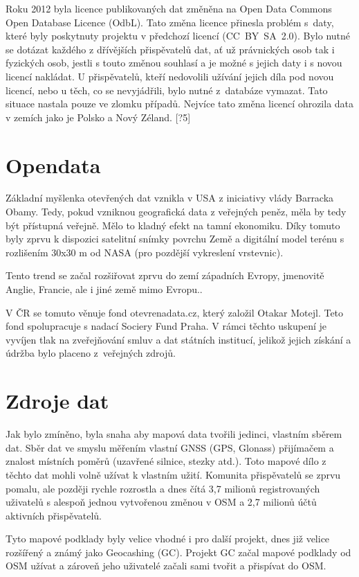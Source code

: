 Roku 2012 byla licence publikovaných dat změněna na Open Data Commons 
Open Database Licence (OdbL). Tato změna licence přinesla problém 
s~daty, které byly poskytnuty projektu v předchozí licencí 
(CC­~BY~SA~2.0). Bylo nutné se dotázat každého z dřívějších 
přispěvatelů dat, ať už právnických osob tak i fyzických osob, jestli 
s touto změnou souhlasí a je možné s jejich daty i s novou licencí 
nakládat. U přispěvatelů, kteří nedovolili užívání jejich díla 
pod novou licencí, nebo u těch, co se nevyjádřili, bylo nutné 
z~databáze vymazat. Tato situace nastala pouze ve zlomku případů. 
Nejvíce tato změna licencí ohrozila data v zemích jako je Polsko a Nový Zéland.
 [?5] 

\section{Opendata}
\label{opendata}
Základní myšlenka otevřených dat vznikla v USA z iniciativy vlády Barracka Obamy. 
Tedy, pokud vzniknou geografická data z veřejných peněz, měla by tedy být přístupná 
veřejně. Mělo to kladný efekt na tamní ekonomiku.
Díky tomuto byly zprvu k dispozici satelitní snímky povrchu 
Země a digitální model terénu s rozlišením 30x30 m od NASA (pro 
pozdější vykreslení vrstevnic). 

Tento trend se začal rozšiřovat zprvu do zemí západních Evropy,
jmenovitě Anglie, Francie, ale i jiné země mimo Evropu..  

V ČR se tomuto věnuje fond otevrenadata.cz, který založil Otakar 
Motejl. Teto fond spolupracuje s nadací Sociery Fund Praha. V rámci 
těchto uskupení je vyvíjen tlak na zveřejňování smluv a dat 
státních institucí, jelikož jejich získání a údržba bylo placeno 
z~veřejných zdrojů.

\section{Zdroje dat}
\label{opendata}

Jak bylo zmíněno, byla snaha aby mapová data tvořili jedinci, vlastním 
sběrem dat. Sběr dat ve smyslu měřením vlastní GNSS (GPS, Glonass) 
přijímačem a znalost místních poměrů (uzavřené silnice, stezky atd.). 
Toto mapové dílo z těchto dat mohli volně užívat k vlastním užití. 
Komunita přispěvatelů se zprvu pomalu, ale později rychle rozrostla a 
dnes čítá 3,7 milionů registrovaných uživatelů s alespoň jednou 
vytvořenou změnou v OSM a 2,7 milionů účtů aktivních přispěvatelů.

Tyto mapové podklady byly velice vhodné i pro další projekt, dnes již 
velice rozšířený a známý jako Geocashing (GC). Projekt GC začal mapové 
podklady od OSM užívat a zároveň jeho uživatelé začali sami tvořit a 
přispívat do OSM. 

